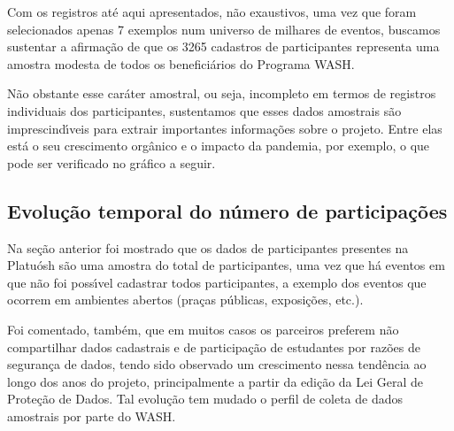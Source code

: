 \documentclass[
12pt,		%
openright,	%
twoside,  %
a4paper,			%
chapter=TITLE,		%
english,			%
french,				%
spanish,			%
brazil				%
]{USPSC-classe/USPSC}
\begin{document}
Com os registros at\'e aqui apresentados, n\~ao exaustivos, uma vez que foram selecionados apenas 7 exemplos num universo de milhares de eventos, buscamos sustentar a afirma\c{c}\~ao de que os 3265 cadastros de participantes representa uma amostra modesta de todos os benefici\'arios do Programa WASH.









N\~ao obstante esse car\'ater amostral, ou seja, incompleto em termos de registros individuais dos participantes, sustentamos que esses dados amostrais s\~ao imprescind\'{\i}veis para extrair importantes informa\c{c}\~oes sobre o projeto. Entre elas est\'a o seu crescimento org\^anico e o impacto da pandemia, por exemplo, o que pode ser verificado no gr\'afico a seguir.









\subsection[Evolu\c{c}\~ao temporal do n\'umero de participa\c{c}\~oes]{Evolu\c{c}\~ao temporal do n\'umero de participa\c{c}\~oes}\label{Evolu\c{c}\~ao temporal do n\'umero de participa\c{c}\~oes}
Na se\c{c}\~ao anterior foi mostrado que os dados de participantes presentes na Platu\'osh s\~ao uma amostra do total de participantes, uma vez que h\'a eventos em que n\~ao foi poss\'{\i}vel cadastrar todos participantes, a exemplo dos eventos que ocorrem em ambientes abertos (pra\c{c}as p\'ublicas, exposi\c{c}\~oes, etc.).









Foi comentado, tamb\'em, que em muitos casos os parceiros preferem n\~ao compartilhar dados cadastrais e de participa\c{c}\~ao de estudantes por raz\~oes de seguran\c{c}a de dados, tendo sido observado um crescimento nessa tend\^encia ao longo dos anos do projeto, principalmente a partir da edi\c{c}\~ao da Lei Geral de Prote\c{c}\~ao de Dados. Tal evolu\c{c}\~ao tem mudado o perfil de coleta de dados amostrais por parte do WASH.
\end{document}
